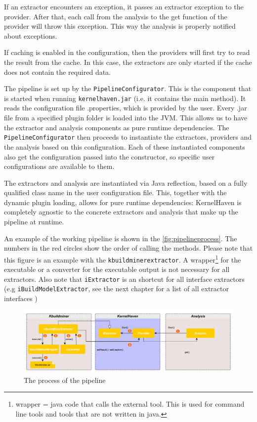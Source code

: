 If an extractor encounters an exception, it passes an extractor exception to the provider. After that, each call from the analysis to the get function of the provider will throw this exception. This way the analysis is properly notified about exceptions.

If caching is enabled in the configuration, then the providers will first try to read the result from the cache. In this case, the extractors are only started if the cache does not contain the required data.

The pipeline is set up by the \texttt{PipelineConfigurator}. This is the component that is started when running \texttt{kernelhaven.jar} (i.e. it contains the main method). It reads the configuration file .properties, which is provided by the user. Every .jar file from a specified plugin folder is loaded into the JVM. This allows us to have the extractor and analysis components as pure runtime dependencies. The \texttt{PipelineConfigurator} then proceeds to instantiate the extractors, providers and the analysis based on this configuration. Each of these instantiated components also get the configuration passed into the constructor, so specific user configurations are available to them.

The extractors and analysis are instantiated via Java reflection, based on a fully qualified class name in the user configuration file. This, together with the dynamic plugin loading, allows for pure runtime dependencies: KernelHaven is completely agnostic to the concrete extractors and analysis that make up the pipeline at runtime.

An example of the working pipeline is shown in the \autoref{fig:pipelineprocess}. The numbers in the red circles show the order of calling the methods. Please note that this figure is an example with the \texttt{kbuildminerextractor}. A wrapper\footnote{wrapper = java code that calls the external tool. This is used for command line tools and tools that are not written in java.} for the executable or a converter for the executable output is not necessary for all extractors. Also note that \texttt{iExtractor} is an shortcut for all interface extractors (e.g \texttt{iBuildModelExtractor}, see the next chapter for a list of all extractor interfaces ) %
\begin{figure} [h!]
  \includegraphics[scale=0.4]{Bilder/Pipeline}
  \caption{The process of the pipeline} \label{fig:pipelineprocess}
\end{figure}


